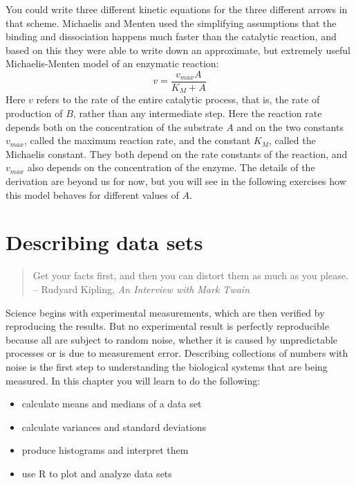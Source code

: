 \documentclass[
  letterpaper,
  DIV=11,
  numbers=noendperiod]{scrreprt}
\begin{document}
You could write three different kinetic equations for the three
different arrows in that scheme. Michaelis and Menten used the
simplifying assumptions that the binding and dissociation happens much
faster than the catalytic reaction, and based on this they were able to
write down an approximate, but extremely useful Michaelis-Menten model
of an enzymatic reaction: \begin{equation}
v = \frac{v_{max} A}{K_M+A}
\label{eq:kinetics_MM_kinetics}
\end{equation} Here \(v\) refers to the rate of the entire catalytic
process, that is, the rate of production of \(B\), rather than any
intermediate step. Here the reaction rate depends both on the
concentration of the substrate \(A\) and on the two constants
\(v_{max}\), called the maximum reaction rate, and the constant \(K_M\),
called the Michaelis constant. They both depend on the rate constants of
the reaction, and \(v_{max}\) also depends on the concentration of the
enzyme. The details of the derivation are beyond us for now, but you
will see in the following exercises how this model behaves for different
values of \(A\).


\hypertarget{describing-data-sets}{%
\chapter{Describing data sets}\label{describing-data-sets}}

\begin{quote}
Get your facts first, and then you can distort them as much as you
please.\\
-- Rudyard Kipling, \emph{An Interview with Mark Twain}
\end{quote}

Science begins with experimental measurements, which are then verified
by reproducing the results. But no experimental result is perfectly
reproducible because all are subject to random noise, whether it is
caused by unpredictable processes or is due to measurement error.
Describing collections of numbers with noise is the first step to
understanding the biological systems that are being measured. In this
chapter you will learn to do the following:

\begin{itemize}
\item
  calculate means and medians of a data set
\item
  calculate variances and standard deviations
\item
  produce histograms and interpret them
\item
  use R to plot and analyze data sets
\end{itemize}
\end{document}
